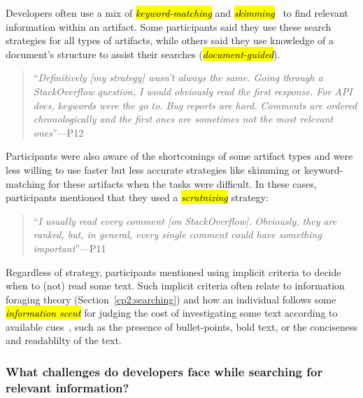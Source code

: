 Developers often use a mix of \hl{\textit{keyword-matching}} and \hl{\textit{skimming}}~\cite{Starke2009, Ko2006a} to find relevant information within an artifact. 
Some participants said they use these search strategies for all types of artifacts, while others said they use knowledge of a document's structure to assist their searches (\hl{\textit{document-guided}}).



\smallskip
\begin{quote}
    ``\textit{Definitively [my strategy] wasn't always the same. Going through a StackOverflow question, I would obviously read the first response. For API docs, keywords were the go to. Bug reports are hard. Comments are ordered chronologically and the first ones are sometimes not the most relevant ones}''---P12
\end{quote}


Participants were also aware of the shortcomings of some artifact types and were less willing to use faster but less accurate strategies like skimming or keyword-matching for these artifacts when the tasks were difficult. 
In these cases, participants mentioned that they used a \hl{\textit{scrutnizing}} strategy:


\smallskip
\begin{quote}
    ``\textit{I usually read every comment [on StackOverflow]. Obviously, they are ranked, but, in general, every single comment could have something important}''---P11
\end{quote}
    


Regardless of strategy, participants mentioned using 
implicit criteria to decide when to (not) read some text.
Such implicit criteria often relate to information foraging theory (Section~\ref{cp2:searching}) and how an individual follows some
\hl{\textit{information scent}} for judging the cost of investigating some text according to available cues~\cite{Pirolli1999}, such as the presence of bullet-points, bold text, or the conciseness and readablilty of the text.



\subsubsection{What challenges do developers face while searching for relevant information?}
\label{cp3:search-challenges}


